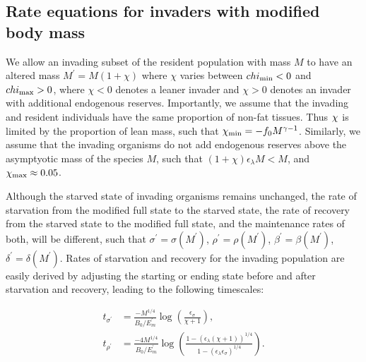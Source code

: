 \documentclass{pnastwo}
\begin{document}
\begin{article}
\begin{table}[h]
\begin{center}
\begin{tabular}{ p{1.2cm} p{3.2cm} l p{2.2cm}|}
   \hline
    \end{tabular}
    \end{center}
   \end{table}


\subsection*{Rate equations for invaders with modified body mass}
We allow an invading subset of the resident population with mass $M$ to have an altered mass $M^\prime = M(1+\chi)$ where $\chi$ varies between $chi_{\rm min} <0$ and $chi_{\rm max}>0$, where $\chi<0$ denotes a leaner invader and $\chi > 0$ denotes an invader with additional endogenous reserves.
Importantly, we assume that the invading and resident individuals have the same proportion of non-fat tissues.
Thus $\chi_{\rm}$ is limited by the proportion of lean mass, such that $\chi_{\rm min} = -f_0M^{\gamma-1}$.
Similarly, we assume that the invading organisms do not add endogenous reserves above the asymptyotic mass of the species $M$, such that $(1+\chi)\epsilon_\lambda M < M$, and $\chi_{\rm max} \approx 0.05$.

Although the starved state of invading organisms remains unchanged, the rate of starvation from the modified full state to the starved state, the rate of recovery from the starved state to the modified full state, and the maintenance rates of both, will be different, such that $\sigma^\prime = \sigma(M^\prime)$, $\rho^\prime = \rho(M^\prime)$, $\beta^\prime = \beta(M^\prime)$, $\delta^\prime = \delta(M^\prime)$.
Rates of starvation and recovery for the invading population are easily derived by adjusting the starting or ending state before and after starvation and recovery, leading to the following timescales:

\begin{align}
t_{\sigma^\prime} &= \frac{-M^{1/4}}{B_0/E_m^\prime}\log \left(\frac{\epsilon_\sigma}{\chi +1}\right), \\ \nonumber
t_{\rho^\prime} &= \frac{-4 M^{1/4} }{B_0/E_m^\prime}\log \left(\frac{1-( \epsilon_\lambda(\chi +1))^{1/4}}{1-(\epsilon_\lambda \epsilon_\sigma)^{1/4}}\right).
\end{align}



\end{article}
\end{document}
